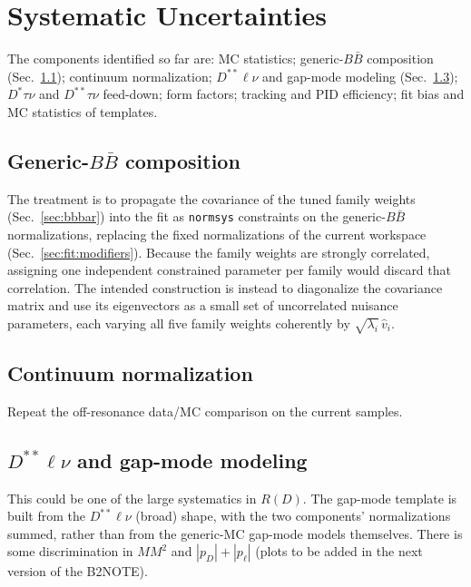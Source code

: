 \section{Systematic Uncertainties}
\label{sec:syst}
The components identified so far
are: MC statistics; generic-$B\bar{B}$ composition (Sec.~\ref{sec:syst:bbbar});
continuum normalization; $D^{**}\ell\nu$ and gap-mode modeling
(Sec.~\ref{sec:syst:gap}); $D^{*}\tau\nu$ and $D^{**}\tau\nu$ feed-down; form
factors; tracking and PID efficiency; fit bias and MC statistics of templates.


\subsection{Generic-$B\bar{B}$ composition}
\label{sec:syst:bbbar}
The treatment is to propagate the covariance of the tuned family weights
(Sec.~\ref{sec:bbbar}) into the fit as \texttt{normsys} constraints on the
generic-$B\bar{B}$ normalizations, replacing the fixed normalizations
of the current workspace (Sec.~\ref{sec:fit:modifiers}).
Because the family weights are strongly correlated, assigning one independent
constrained parameter per family would discard that correlation.
The intended construction is instead to diagonalize the covariance matrix and
use its eigenvectors as a small set of uncorrelated nuisance parameters, each
varying all five family weights coherently by
$\sqrt{\lambda_{i}}\, \hat{v}_{i}$.


\subsection{Continuum normalization}
\label{sec:syst:continuum}
  Repeat the
off-resonance data/MC comparison on the current samples.


\subsection{$D^{**}\ell\nu$ and gap-mode modeling}
\label{sec:syst:gap}
This could be one of the large
systematics in $R(D)$. The gap-mode template
is built from the $D^{**}\ell\nu$ (broad) shape, with the two components'
normalizations summed, rather than from the generic-MC gap-mode models
themselves. There is some discrimination in $MM^2$ and $|p_D|+|p_\ell|$ (plots to be added in the next version of the B2NOTE).




